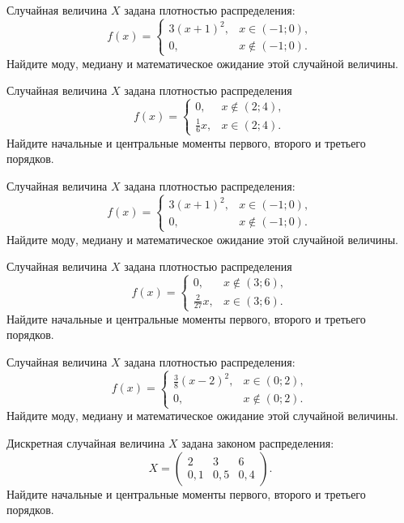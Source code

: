 \vfill

\newpage\setcounter{zad}{0}

\z Случайная величина $X$ задана плотностью распределения: $$f(x) = \begin{cases} 3(x+1)^2, & x \in (-1; 0), \\ 0, & x \not\in (-1; 0). \end{cases}$$ Найдите моду, медиану и математическое ожидание этой случайной величины.


\vfill

\z Случайная величина $X$ задана плотностью распределения $$f(x) = \begin{cases}0, & x\not\in(2; 4), \\ \frac{1}{6}x, & x\in(2; 4).\end{cases}$$ Найдите начальные и центральные моменты первого, второго и третьего порядков.
 

\vfill

\newpage\setcounter{zad}{0}

\z Случайная величина $X$ задана плотностью распределения: $$f(x) = \begin{cases} 3(x+1)^2, & x \in (-1; 0), \\ 0, & x \not\in (-1; 0). \end{cases}$$ Найдите моду, медиану и математическое ожидание этой случайной величины.


\vfill

\z Случайная величина $X$ задана плотностью распределения $$f(x) = \begin{cases}0, & x\not\in(3; 6), \\ \frac{2}{27}x, & x\in(3; 6).\end{cases}$$ Найдите начальные и центральные моменты первого, второго и третьего порядков.
 

\vfill

\newpage\setcounter{zad}{0}

\z Случайная величина $X$ задана плотностью распределения: $$f(x) = \begin{cases} \frac{3}{8}(x-2)^2, & x \in (0; 2), \\ 0, & x \not\in (0; 2). \end{cases}$$ Найдите моду, медиану и математическое ожидание этой случайной величины.


\vfill

\z Дискретная случайная величина $X$ задана законом распределения: $$ X = \left(\begin{array}{rrr}2 & 3 & 6\\0{,}1 & 0{,}5 & 0{,}4\end{array}\right).$$ Найдите начальные и центральные моменты первого, второго и третьего порядков.
 

